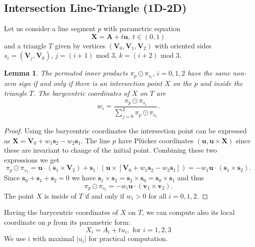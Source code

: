 \documentclass{elsarticle}
\newtheorem{lemma}[theorem]{Lemma}
\def\vc#1{\mathbf{\boldsymbol{#1}}}     %
\newcommand{\plucker}{Pl\"{u}cker }
\begin{document}
\subsection{Intersection Line-Triangle (1D-2D)}
Let us consider a line segment $p$ with parametric equation 
\begin{equation}
    \label{eq:line_parametric}
    \vc X = \vc A + t\vc u,\ t\in (0,1)
\end{equation}
and a triangle $T$ given by vertices $(\vc V_0, \vc V_1, \vc V_2)$ 
with oriented sides $s_i=(\vc V_j, \vc V_k)$, $j=(i+1)\text{ mod }3$, $k=(i+2)\text{ mod }3$. 
\begin{lemma}
The permuted inner products $\pi_p \odot \pi_{s_i},\, i=0,1,2$ have the same non-zero sign if and only if there
is an intersection point $X$ on the $p$ and inside the triangle $T$. 
The barycentric coordinates of $X$ on $T$ are
\begin{equation}
  \label{eq:bary_centric}
   w_i = \frac{\pi_p \odot \pi_{s_i}}{ \sum_{j=0}^{2} \pi_p \odot \pi_{s_i} }.
\end{equation}
\end{lemma}
\begin{proof}
Using the barycentric coordinates the intersection point can be expressed as $\vc X = \vc V_0 + w_1 \vc s_2 - w_2 \vc s_1$.
The line $p$ have \plucker coordinates $(\vc u, \vc u \times \vc X)$ since these are invariant to change of the initial point. 
Combining these two expressions we get
\[
   \pi_p \odot \pi_{s_1} = \vc u \cdot (\vc s_1 \times \vc V_2) + \vc s_1 \cdot ( \vc u \times [\vc V_0 + w_1\vc s_2 - w_2 \vc s_1])
   =-w_1 \vc u \cdot (\vc s_1 \times \vc s_2).
\]
Since $\vc s_0 + \vc s_1 + \vc s_2=0$ we have $ \vc s_1 \times \vc s_2 = \vc s_2 \times \vc s_0 = \vc s_0 \times \vc s_1$ and thus
\[
   \pi_p \odot \pi_{s_i} = -w_i \vc u \cdot (\vc v_1 \times \vc v_2).
\]
The point $X$ is inside of $T$ if and only if $w_i>0$ for all $i=0,1,2$.
\end{proof}
Having the barycentric coordinates of $X$ on $T$, we can compute also its local coordinate on $p$ from its parametric form:
\begin{equation}
   \label{eq:line}
   X_i  = A_i + t u_i, \text{ for } i=1,2,3
\end{equation}
We use $i$ with maximal $|u_i|$ for practical computation. 
\end{document}
